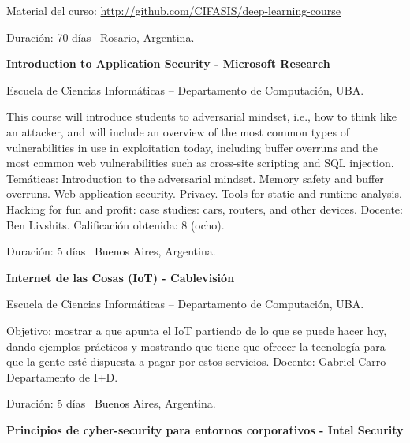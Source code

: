 \documentclass[letterpaper,MMMyyyy,nonstop]{simpleresumecv}
\begin{document}
\begin{body}
\begin{detail}
	\SubBulletItem
	Material del curso: \href{http://github.com/CIFASIS/deep-learning-course}
	{http://github.com/CIFASIS/deep-learning-course}
\end{detail}
Duración: 70 días \SubBulletSymbol\, Rosario, Argentina.

\BigGap
\textbf{Introduction to Application Security - Microsoft Research}
\hfill
{}

\BulletItem Escuela de Ciencias Informáticas – Departamento de Computación, UBA.
\begin{detail}
	\SubBulletItem
	This course will introduce students to adversarial mindset, i.e., how to think like an attacker, and will include an overview of the most common types of vulnerabilities in use in exploitation today, including buffer overruns and the most common web vulnerabilities such as cross-site scripting and SQL injection.
	\SubBulletItem
	Temáticas: Introduction to the adversarial mindset. Memory safety and buffer overruns. Web application security. Privacy. Tools for static and runtime analysis. Hacking for fun and profit: case studies: cars, routers, and other devices.
	\SubBulletItem
	Docente: Ben Livshits.
	\SubBulletItem
	Calificación obtenida: 8 (ocho).
\end{detail}
Duración: 5 días \SubBulletSymbol\, Buenos Aires, Argentina.

\BigGap
\textbf{Internet de las Cosas (IoT) - Cablevisión}
\hfill
{}

\BulletItem Escuela de Ciencias Informáticas – Departamento de Computación, UBA.
\begin{detail}
	\SubBulletItem
	Objetivo: mostrar a que apunta el IoT partiendo de lo que se puede hacer hoy, dando ejemplos prácticos y  mostrando que tiene que ofrecer la tecnología para que la gente	esté dispuesta a pagar por estos servicios.	
	\SubBulletItem
	Docente: Gabriel Carro - Departamento de I+D.
\end{detail}
Duración: 5 días \SubBulletSymbol\, Buenos Aires, Argentina.

\BigGap
\textbf{Principios de cyber-security para entornos corporativos - Intel Security}
\hfill
{}


\end{body}
\end{document}
